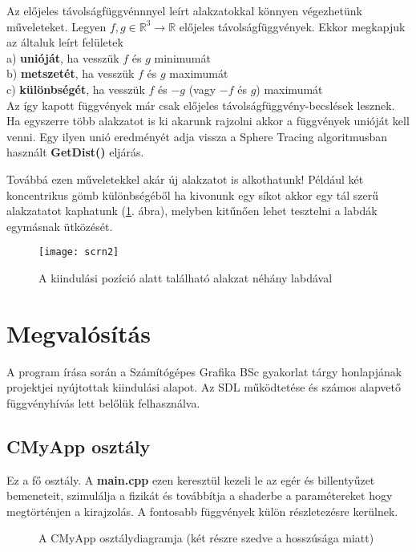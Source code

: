 Az előjeles távolságfüggvénnnyel leírt alakzatokkal könnyen végezhetünk műveleteket. Legyen $f, g \in \mathbb{R}^{3} \rightarrow \mathbb{R}$ előjeles távolságfüggvények. Ekkor megkapjuk az általuk leírt felületek \\
a) \textbf{unióját}, ha vesszük $f$ és $g$ minimumát \\
b) \textbf{metszetét}, ha vesszük $f$ és $g$ maximumát \\
c) \textbf{különbségét}, ha vesszük $f$ és $-g$ (vagy $-f$ és $g$) maximumát\\
Az így kapott függvények már csak előjeles távolságfüggvény-becslések lesznek. Ha egyszerre több alakzatot is ki akarunk rajzolni akkor a függvények unióját kell venni. Egy ilyen unió eredményét adja vissza a Sphere Tracing algoritmusban használt \textbf{GetDist()} eljárás. 

Továbbá ezen műveletekkel akár új alakzatot is alkothatunk! Például két koncentrikus gömb különbségéből ha kivonunk egy síkot akkor egy tál szerű alakzatatot kaphatunk (\ref{fig:bowl}. ábra), melyben kitűnően lehet tesztelni a labdák egymásnak ütközését.

\begin{figure}[H]
	\centering
	\texttt{[image: scrn2]}
	\caption{A kiindulási pozíció alatt található alakzat néhány labdával}
	\label{fig:bowl}
\end{figure}

\cleardoublepage
\section{Megvalósítás}

A program írása során a Számítógépes Grafika BSc gyakorlat tárgy honlapjának \cite{GrafikaB26:online} projektjei nyújtottak kiindulási alapot. Az SDL működtetése és számos alapvető függvényhívás lett belőlük felhasználva.

\subsection{CMyApp osztály}

Ez a fő osztály. A \textbf{main.cpp} ezen keresztül kezeli le az egér és billentyűzet bemeneteit, szimulálja a fizikát és továbbítja a shaderbe a paramétereket hogy megtörténjen a kirajzolás. A fontosabb függvények külön részletezésre kerülnek.

\begin{figure}[H]
	\centering
	\hspace{1pt}
	\caption{A CMyApp osztálydiagramja (két részre szedve a hosszúsága miatt)}
	\label{fig:uml}
\end{figure}

